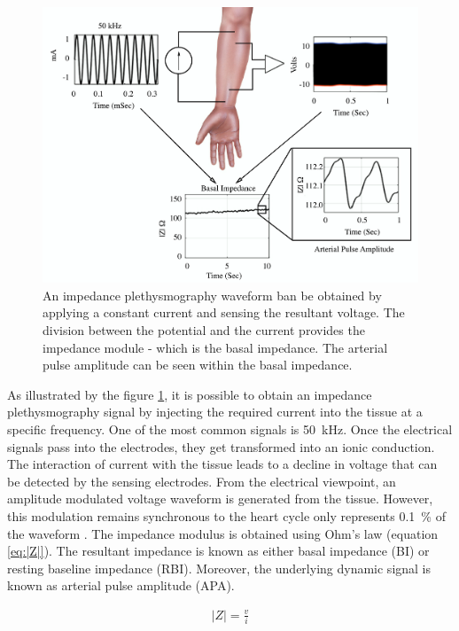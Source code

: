 \begin{figure}[!htpb]
	\centering
	\includegraphics[width=\textwidth,keepaspectratio]{figure15}    
	\caption[How to get an impedance plethysmography waveform]{An impedance plethysmography waveform ban be obtained by applying a constant current and sensing the resultant voltage. The division between the potential and the current provides the impedance module - which is the basal impedance. The arterial pulse amplitude can be seen within the basal impedance.}
	\label{fig:envelope iPG}
\end{figure}

As illustrated by the figure \ref{fig:envelope iPG}, it is possible to obtain an impedance plethysmography signal by injecting the required current into the tissue at a specific frequency. One of the most common signals is \SI{50}{\kilo\hertz}. Once the electrical signals pass into the electrodes, they get transformed into an ionic conduction. The interaction of current with the tissue leads to a decline in voltage that can be detected by the sensing electrodes. From the electrical viewpoint, an amplitude modulated voltage waveform is generated from the tissue. However, this modulation remains synchronous to the heart cycle only represents \SI{0.1}{\percent} of the waveform \cite{anderson1984impedance}. 
The impedance modulus is obtained using Ohm's law (equation \ref{eq:|Z|}). The resultant impedance is known as either basal impedance (BI) or resting baseline impedance (RBI). Moreover, the underlying dynamic signal is known as arterial pulse amplitude (APA). 

\begin{align}
	\label{eq:|Z|}
	\left| Z \right| = \frac{v}{i}
\end{align}


